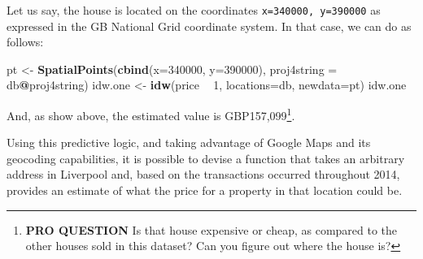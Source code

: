 \documentclass[
]{book}
\newenvironment{Shaded}{\begin{snugshade}}{\end{snugshade}}
\newcommand{\DataTypeTok}[1]{\textcolor[rgb]{0.13,0.29,0.53}{#1}}
\newcommand{\DecValTok}[1]{\textcolor[rgb]{0.00,0.00,0.81}{#1}}
\newcommand{\KeywordTok}[1]{\textcolor[rgb]{0.13,0.29,0.53}{\textbf{#1}}}
\newcommand{\NormalTok}[1]{#1}
\newcommand{\OperatorTok}[1]{\textcolor[rgb]{0.81,0.36,0.00}{\textbf{#1}}}
\newcommand{\StringTok}[1]{\textcolor[rgb]{0.31,0.60,0.02}{#1}}
\begin{document}
Let us say, the house is located on the coordinates \texttt{x=340000,\ y=390000} as expressed in the GB National Grid coordinate system. In that case, we can do as follows:

\begin{Shaded}
\begin{Highlighting}[]
\NormalTok{pt <-}\StringTok{ }\KeywordTok{SpatialPoints}\NormalTok{(}\KeywordTok{cbind}\NormalTok{(}\DataTypeTok{x=}\DecValTok{340000}\NormalTok{, }\DataTypeTok{y=}\DecValTok{390000}\NormalTok{),}
                    \DataTypeTok{proj4string =}\NormalTok{ db}\OperatorTok{@}\NormalTok{proj4string)}
\NormalTok{idw.one <-}\StringTok{ }\KeywordTok{idw}\NormalTok{(price }\OperatorTok{~}\StringTok{ }\DecValTok{1}\NormalTok{, }\DataTypeTok{locations=}\NormalTok{db, }\DataTypeTok{newdata=}\NormalTok{pt)}
\NormalTok{idw.one}
\end{Highlighting}
\end{Shaded}

And, as show above, the estimated value is GBP157,099\footnote{\textbf{PRO QUESTION} Is that house expensive or cheap, as compared to the other houses sold in this dataset? Can you figure out where the house is?}.

Using this predictive logic, and taking advantage of Google Maps and its geocoding capabilities, it is possible to devise a function that takes an arbitrary address in Liverpool and, based on the transactions occurred throughout 2014, provides an estimate of what the price for a property in that location could be.
\end{document}
